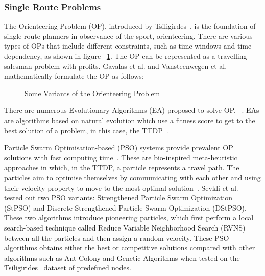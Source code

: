 \subsubsection{Single Route Problems}

The Orienteering Problem (OP), introduced by Tsiligirdes~\cite{Tsiligirides1984}, is the foundation of
single route planners in observance of the sport, orienteering. There are
various types of OPs that include different constraints, such as time windows
and time dependency, as shown in figure ~\ref{variants}. The OP can be represented as a
travelling salesman problem with profits. Gavalas et al. and Vansteenwegen et al.~\cite{Gavalas2014a, Vansteenwegen2011b}
mathematically formulate the OP as follows:






\begin{figure}[h]
\caption{Some Variants of the Orienteering Problem}
\label{variants}
\end{figure}

There are numerous Evolutionary Algorithms (EA) proposed to solve OP.\@
~\cite{Kobeaga2018,Wang2008}. EAs are algorithms based on natural evolution which
use a fitness score to get to the best solution of a problem, in this case, the
TTDP~\cite{Gunawan2016}.



Particle Swarm Optimisation-based (PSO) systems provide prevalent OP solutions
with fast computing time~\cite{Yu2019}. These are bio-inspired meta-heuristic approaches in
which, in the TTDP, a particle represents a travel path. The particles aim to
optimise themselves by communicating with each other and using their velocity
property to move to the most optimal solution~\cite{RezaeeJordehi2013}. Sevkli
et al.~\cite{Sevkli2010,Sevkli2010a} tested out two PSO variants:
Strengthened Particle Swarm Optimization (StPSO) and Discrete Strengthened
Particle Swarm Optimization (DStPSO). These two algorithms introduce pioneering
particles, which first perform a local search-based technique called Reduce
Variable Neighborhood Search (RVNS) between all the particles and then assign a
random velocity. These PSO algorithms obtains either the best or competitive
solutions compared with other algorithms such as Ant Colony and Genetic
Algorithms when tested on the Tsiligirides~\cite{Tsiligirides1984, Chen2011a} dataset of predefined nodes.

